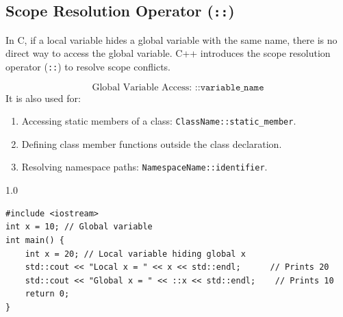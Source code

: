 \documentclass[12pt,a4paper]{article}
\begin{document}
\subsection{Scope Resolution Operator (\texttt{::})}
In C, if a local variable hides a global variable with the same name, there is no direct way to access the global variable. C++ introduces the scope resolution operator (\texttt{::}) to resolve scope conflicts.
\begin{tcolorbox}[formulabox, title={\textbf{Scope Resolution Syntax}}]
\begin{equation}
  \text{Global Variable Access: } \texttt{::variable\_name}
\end{equation}
It is also used for:
\begin{enumerate}[label=\alph*., leftmargin=1.5em, itemsep=1pt]
  \item Accessing static members of a class: \texttt{ClassName::static\_member}.
  \item Defining class member functions outside the class declaration.
  \item Resolving namespace paths: \texttt{NamespaceName::identifier}.
\end{enumerate}
\end{tcolorbox}

\begin{tcolorbox}[examplebox, title={Code Example: Global variable access via Scope Resolution}]
\begin{spacing}{1.0}
\begin{verbatim}
#include <iostream>
int x = 10; // Global variable
int main() {
    int x = 20; // Local variable hiding global x
    std::cout << "Local x = " << x << std::endl;      // Prints 20
    std::cout << "Global x = " << ::x << std::endl;    // Prints 10
    return 0;
}
\end{verbatim}
\end{spacing}
\end{tcolorbox}
\end{document}

